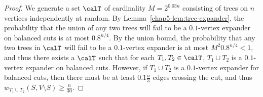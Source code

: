 \begin{proof}
    We generate a set $\calT$ of cardinality $M = 2^{0.03n}$ consisting of trees on $n$ vertices independently at random. By Lemma~\ref{chap5-lem:tree-expander}, the probability that the union of any two trees will fail to be a $0.1$-vertex expander on balanced cuts is at most $0.8^{n/4}$. By the union bound, the probability that any two trees in $\calT$ will fail to be a $0.1$-vertex expander is at most $M^2 0.8^{n/4} < 1$, and thus there exists a $\calT$ such that for each $T_1, T_2 \in \calT$, $T_1 \cup T_2$ is a $0.1$-vertex expander on balanced cuts. However, if $T_1 \cup T_2$ is a $0.1$-vertex expander for balanced cuts, then there must be at least $0.1 \frac{n}{3}$ edges crossing the cut, and thus $w_{T_1 \cup T_2}(S, V\setminus S) \geq \frac{n}{30}$.
\end{proof}

